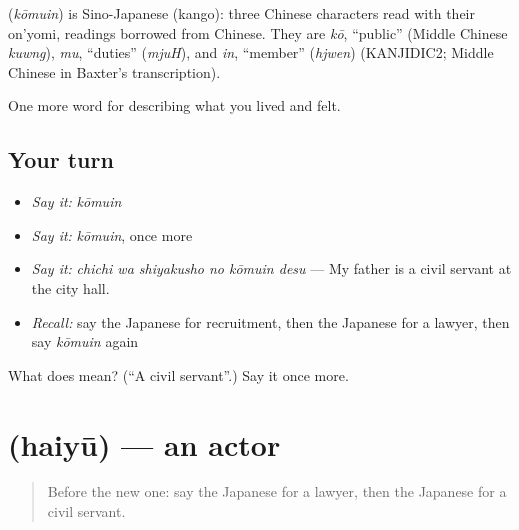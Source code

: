 \begin{cousinweb}
\textbf{} (\emph{kōmuin}) is Sino-Japanese (kango): three Chinese characters read with their on'yomi, readings borrowed from Chinese. They are \emph{kō}, \textquotedblleft{}public\textquotedblright{} (Middle Chinese \emph{kuwng}), \emph{mu}, \textquotedblleft{}duties\textquotedblright{} (\emph{mjuH}), and \emph{in}, \textquotedblleft{}member\textquotedblright{} (\emph{hjwen}) (KANJIDIC2; Middle Chinese in Baxter's transcription).
\end{cousinweb}

\begin{grammarlens}[title={What you've built}]
One more word for describing what you lived and felt.
\end{grammarlens}

\subsection*{Your turn}
\begin{itemize}
\raggedright
  \item \emph{Say it:} \emph{kōmuin}
  \item \emph{Say it:} \emph{kōmuin}, once more
  \item \emph{Say it:} \emph{chichi wa shiyakusho no kōmuin desu} — My father is a civil servant at the city hall.
  \item \emph{Recall:} say the Japanese for recruitment, then the Japanese for a lawyer, then say \emph{kōmuin} again
\end{itemize}

\begin{tcolorbox}[breakable,colback=teal!4,colframe=teal!35!black,title={Before you move on}]
What does  mean? (\textquotedblleft{}A civil servant\textquotedblright{}.) Say it once more.
\end{tcolorbox}
\section[\texorpdfstring{\ja{はいゆう} (haiyū)}{はいゆう (haiyū)}]{ (haiyū) — an actor}

\label{lesson:JA-C458-haiyuu}



\begin{quote}
Before the new one: say the Japanese for a lawyer, then the Japanese for a civil servant.
\end{quote}

